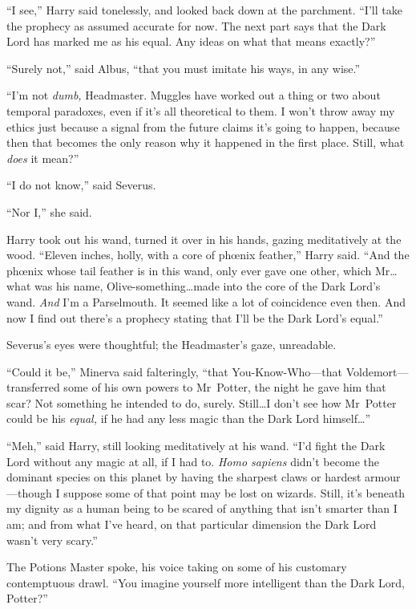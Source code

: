 “I see,” Harry said tonelessly, and looked back down at the parchment. “I’ll take the prophecy as assumed accurate for now. The next part says that the Dark Lord has marked me as his equal. Any ideas on what that means exactly?”

“Surely not,” said Albus, “that you must imitate his ways, in any wise.”

“I’m not \emph{dumb,} Headmaster. Muggles have worked out a thing or two about temporal paradoxes, even if it’s all theoretical to them. I won’t throw away my ethics just because a signal from the future claims it’s going to happen, because then that becomes the only reason why it happened in the first place. Still, what \emph{does} it mean?”

“I do not know,” said Severus.

“Nor I,” she said.

Harry took out his wand, turned it over in his hands, gazing meditatively at the wood. “Eleven inches, holly, with a core of phœnix feather,” Harry said. “And the phœnix whose tail feather is in this wand, only ever gave one other, which Mr…what was his name, Olive-something…made into the core of the Dark Lord’s wand. \emph{And} I’m a Parselmouth. It seemed like a lot of coincidence even then. And now I find out there’s a prophecy stating that I’ll be the Dark Lord’s equal.”

Severus’s eyes were thoughtful; the Headmaster’s gaze, unreadable.

“Could it be,” Minerva said falteringly, “that You-Know-Who—that Voldemort—transferred some of his own powers to Mr~Potter, the night he gave him that scar? Not something he intended to do, surely. Still…I don’t see how Mr~Potter could be his \emph{equal,} if he had any less magic than the Dark Lord himself…”

“Meh,” said Harry, still looking meditatively at his wand. “I’d fight the Dark Lord without any magic at all, if I had to. \emph{Homo sapiens} didn’t become the dominant species on this planet by having the sharpest claws or hardest armour—though I suppose some of that point may be lost on wizards. Still, it’s beneath my dignity as a human being to be scared of anything that isn’t smarter than I am; and from what I’ve heard, on that particular dimension the Dark Lord wasn’t very scary.”

The Potions Master spoke, his voice taking on some of his customary contemptuous drawl. “You imagine yourself more intelligent than the Dark Lord, Potter?”

